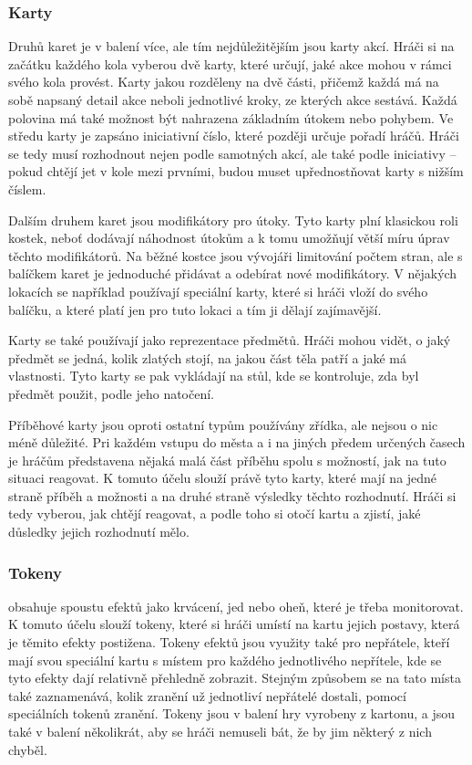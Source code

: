 \subsubsection*{Karty}
\label{subsubsec:gh_comp_cards}

Druhů karet je v balení více, ale tím nejdůležitějším jsou karty akcí. Hráči si na začátku každého kola vyberou dvě karty, které určují, jaké akce mohou v rámci svého kola provést. Karty jakou rozděleny na dvě části, přičemž každá má na sobě napsaný detail akce neboli jednotlivé kroky, ze kterých akce sestává. Každá polovina má také možnost být nahrazena základním útokem nebo pohybem. Ve středu karty je zapsáno iniciativní číslo, které později určuje pořadí hráčů. Hráči se tedy musí rozhodnout nejen podle samotných akcí, ale také podle iniciativy -- pokud chtějí jet v kole mezi prvními, budou muset upřednostňovat karty s nižším číslem.

Dalším druhem karet jsou modifikátory pro útoky. Tyto karty plní klasickou roli kostek, neboť dodávají náhodnost útokům a k tomu umožňují větší míru úprav těchto modifikátorů. Na běžné kostce jsou vývojáři limitování počtem stran, ale s balíčkem karet je jednoduché přidávat a odebírat nové modifikátory. V nějakých lokacích se například používají speciální karty, které si hráči vloží do svého balíčku, a které platí jen pro tuto lokaci a tím ji dělají zajímavější.

Karty se také používají jako reprezentace předmětů. Hráči mohou vidět, o jaký předmět se jedná, kolik zlatých stojí, na jakou část těla patří a jaké má vlastnosti. Tyto karty se pak vykládají na stůl, kde se kontroluje, zda byl předmět použit, podle jeho natočení.

Příběhové karty jsou oproti ostatní typům používány zřídka, ale nejsou o nic méně důležité. Pri každém vstupu do města a i na jiných předem určených časech je hráčům představena nějaká malá část příběhu spolu s možností, jak na tuto situaci reagovat. K tomuto účelu slouží právě tyto karty, které mají na jedné straně příběh a možnosti a na druhé straně výsledky těchto rozhodnutí. Hráči si tedy vyberou, jak chtějí reagovat, a podle toho si otočí kartu a zjistí, jaké důsledky jejich rozhodnutí mělo.

\subsubsection*{Tokeny}
\label{subsubsec:gh_comp_tokens}

 obsahuje spoustu efektů jako krvácení, jed nebo oheň, které je třeba monitorovat. K tomuto účelu slouží tokeny, které si hráči umístí na kartu jejich postavy, která je těmito efekty postižena. Tokeny efektů jsou využity také pro nepřátele, kteří mají svou speciální kartu s místem pro každého jednotlivého nepřítele, kde se tyto efekty dají relativně přehledně zobrazit. Stejným způsobem se na tato místa také zaznamenává, kolik zranění už jednotliví nepřátelé dostali, pomocí speciálních tokenů zranění. Tokeny jsou v balení hry vyrobeny z kartonu, a jsou také v balení několikrát, aby se hráči nemuseli bát, že by jim některý z nich chyběl.

